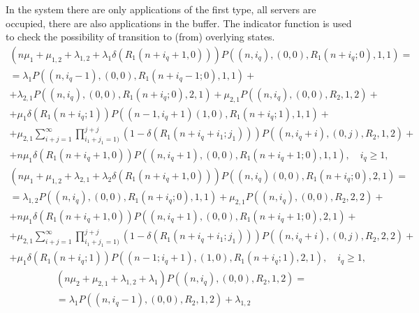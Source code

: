 {In the system there are only applications of the first type, all
servers are occupied, there are also applications in the buffer. The
indicator function is used to check the possibility of transition to
(from) overlying states.
\begin{multline}
  \left(n\mu_1+\mu_{1,2}+\lambda_{1,2}+\lambda_1 \delta\left(R_1
      (n+i_q+1,0)\right)\right) P\left((n,i_q),(0,0),R_1
    (n+i_q;0),1,1\right) = \\ = \lambda_1 P\left((n,i_q-1),(0,0),R_1
    (n+i_q-1;0),1,1\right)+ \\ +\lambda_{2,1} P\left((n,i_q),(0,0),R_1
    (n+i_q;0),2,1\right)+ %
  \mu_{2,1}
  P\left((n,i_q),(0,0),R_2,1,2\right)+ \\ +\mu_1 \delta\left(R_1
    (n+i_q;1)\right) P\left((n-1,i_q+1)(1,0),R_1 (n+i_q;1),1,1\right)+
  \\ + \mu_{2,1}
  \sum\limits_{i+j=1}^{\infty}\prod\limits_{i_1+j_1=1)}^{j+j}\left(1-\delta\left(R_1
      (n+i_q+i_1;j_1) \right)\right)
  P\left((n,i_q+i),(0,j),R_2,1,2\right)+\\ + n\mu_1 \delta\left(R_1
    (n+i_q+1,0)\right) P\left((n,i_q+1),(0,0),R_1
    (n+i_q+1;0),1,1\right), \quad i_q\geqslant 1,
\label{eq:4.1}
\end{multline}
\begin{multline}
  \left(n\mu_1+\mu_{1,2}+\lambda_{2,1}+\lambda_2\delta\left(R_1
      (n+i_q+1,0)\right)\right) P\left((n,i_q)(0,0),R_1
    (n+i_q;0),2,1\right) = \\ =
  \lambda_{1,2} P\left((n,i_q),(0,0),R_1 (n+i_q;0),1,1\right)+
  \mu_{2,1} P\left((n,i_q),(0,0),R_2,2,2\right)+\\ + n\mu_1
  \delta\left(R_1 (n+i_q+1,0)\right) P\left((n,i_q+1),(0,0),R_1
    (n+i_q+1;0),2,1\right) +\\ + \mu_{2,1}
  \sum\limits_{i+j=1}^{\infty}\prod\limits_{i_1+j_1=1)}^{j+j}\left(1-\delta\left(R_1
      (n+i_q+i_1;j_1) \right)\right)
  P\left((n,i_q+i),(0,j),R_2,2,2\right)+\\ + \mu_1 \delta\left(R_1
    (n+i_q;1)\right) P\left((n-1;i_q+1),(1,0),R_1
    (n+i_q;1),2,1\right), \quad i_q\geqslant 1,
\label{eq:4.2}
\end{multline}
\begin{multline}
  \left(n\mu_2+\mu_{2,1}+\lambda_{1,2}+\lambda_1\right)
  P\left((n,i_q),(0,0),R_2,1,2\right) = \\ =\lambda_1
  P\left((n,i_q-1),(0,0),R_2,1,2\right)+ \lambda_{1,2}

\end{multline}}
